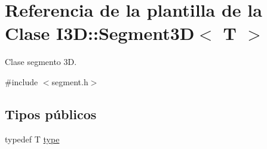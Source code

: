 \hypertarget{class_i3_d_1_1_segment3_d}{}\section{Referencia de la plantilla de la Clase I3D\+:\+:Segment3D$<$ T $>$}
\label{class_i3_d_1_1_segment3_d}


Clase segmento 3D.  




{\ttfamily \#include $<$segment.\+h$>$}

\subsection*{Tipos públicos}
\begin{DoxyCompactItemize}
\item 
typedef T \hyperlink{class_i3_d_1_1_segment3_d_a367ef41bf0a1e329a4363fe5e3731612}{type}
\end{DoxyCompactItemize}
